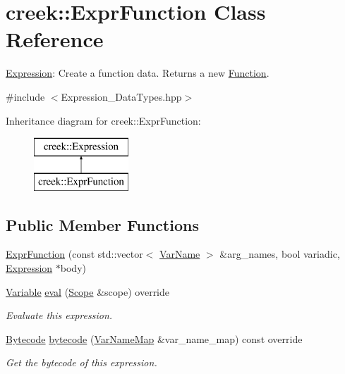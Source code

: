 \hypertarget{classcreek_1_1_expr_function}{}\section{creek\+:\+:Expr\+Function Class Reference}
\label{classcreek_1_1_expr_function}


\hyperlink{classcreek_1_1_expression}{Expression}\+: Create a function data. Returns a new {\ttfamily \hyperlink{classcreek_1_1_function}{Function}}.  




{\ttfamily \#include $<$Expression\+\_\+\+Data\+Types.\+hpp$>$}

Inheritance diagram for creek\+:\+:Expr\+Function\+:\begin{figure}[H]
\begin{center}
\leavevmode
\includegraphics[height=2.000000cm]{classcreek_1_1_expr_function}
\end{center}
\end{figure}
\subsection*{Public Member Functions}
\begin{DoxyCompactItemize}
\item 
\hyperlink{classcreek_1_1_expr_function_a876b7e64e0864d3e34c349960dbf9450}{Expr\+Function} (const std\+::vector$<$ \hyperlink{classcreek_1_1_var_name}{Var\+Name} $>$ \&arg\+\_\+names, bool variadic, \hyperlink{classcreek_1_1_expression}{Expression} $\ast$body)
\item 
\hyperlink{classcreek_1_1_variable}{Variable} \hyperlink{classcreek_1_1_expr_function_a10f8cd65e471d823c68b81fc20435738}{eval} (\hyperlink{classcreek_1_1_scope}{Scope} \&scope) override
\begin{DoxyCompactList}\small\item\em Evaluate this expression. \end{DoxyCompactList}\item 
\hyperlink{classcreek_1_1_bytecode}{Bytecode} \hyperlink{classcreek_1_1_expr_function_abfed3d24bd0649351fa30bd608b87f1b}{bytecode} (\hyperlink{classcreek_1_1_var_name_map}{Var\+Name\+Map} \&var\+\_\+name\+\_\+map) const  override\hypertarget{classcreek_1_1_expr_function_abfed3d24bd0649351fa30bd608b87f1b}{}\label{classcreek_1_1_expr_function_abfed3d24bd0649351fa30bd608b87f1b}

\begin{DoxyCompactList}\small\item\em Get the bytecode of this expression. \end{DoxyCompactList}\end{DoxyCompactItemize}


